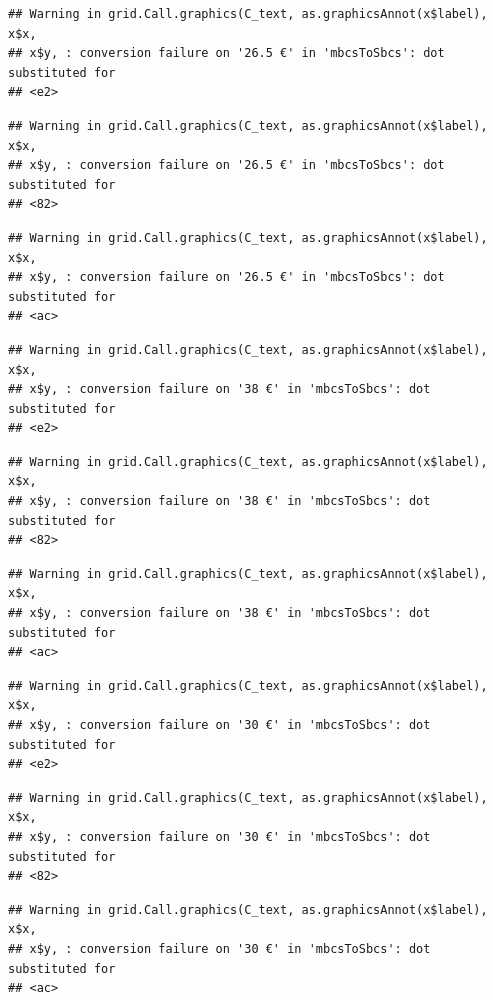\documentclass[]{gitbook}
\begin{document}
\begin{verbatim}
## Warning in grid.Call.graphics(C_text, as.graphicsAnnot(x$label), x$x,
## x$y, : conversion failure on '26.5 €' in 'mbcsToSbcs': dot substituted for
## <e2>
\end{verbatim}

\begin{verbatim}
## Warning in grid.Call.graphics(C_text, as.graphicsAnnot(x$label), x$x,
## x$y, : conversion failure on '26.5 €' in 'mbcsToSbcs': dot substituted for
## <82>
\end{verbatim}

\begin{verbatim}
## Warning in grid.Call.graphics(C_text, as.graphicsAnnot(x$label), x$x,
## x$y, : conversion failure on '26.5 €' in 'mbcsToSbcs': dot substituted for
## <ac>
\end{verbatim}

\begin{verbatim}
## Warning in grid.Call.graphics(C_text, as.graphicsAnnot(x$label), x$x,
## x$y, : conversion failure on '38 €' in 'mbcsToSbcs': dot substituted for
## <e2>
\end{verbatim}

\begin{verbatim}
## Warning in grid.Call.graphics(C_text, as.graphicsAnnot(x$label), x$x,
## x$y, : conversion failure on '38 €' in 'mbcsToSbcs': dot substituted for
## <82>
\end{verbatim}

\begin{verbatim}
## Warning in grid.Call.graphics(C_text, as.graphicsAnnot(x$label), x$x,
## x$y, : conversion failure on '38 €' in 'mbcsToSbcs': dot substituted for
## <ac>
\end{verbatim}

\begin{verbatim}
## Warning in grid.Call.graphics(C_text, as.graphicsAnnot(x$label), x$x,
## x$y, : conversion failure on '30 €' in 'mbcsToSbcs': dot substituted for
## <e2>
\end{verbatim}

\begin{verbatim}
## Warning in grid.Call.graphics(C_text, as.graphicsAnnot(x$label), x$x,
## x$y, : conversion failure on '30 €' in 'mbcsToSbcs': dot substituted for
## <82>
\end{verbatim}

\begin{verbatim}
## Warning in grid.Call.graphics(C_text, as.graphicsAnnot(x$label), x$x,
## x$y, : conversion failure on '30 €' in 'mbcsToSbcs': dot substituted for
## <ac>
\end{verbatim}
\end{document}
